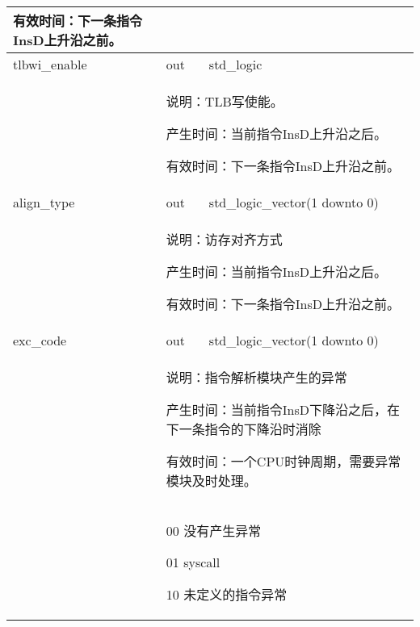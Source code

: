 \begin{tabularx}{\textwidth}{lll}
{                有效时间：下一条指令InsD上升沿之前。
            } \\
            \midrule
            tlbwi\_enable   & out       & std\_logic \\
            \cmidrule(l){2-3}
            &
            \multicolumn{2}{X}{
                说明：TLB写使能。

                产生时间：当前指令InsD上升沿之后。

                有效时间：下一条指令InsD上升沿之前。
            } \\
            \midrule
            align\_type   & out       & std\_logic\_vector(1 downto 0) \\
            \cmidrule(l){2-3}
            &
            \multicolumn{2}{X}{
                说明：访存对齐方式

                产生时间：当前指令InsD上升沿之后。

                有效时间：下一条指令InsD上升沿之前。
            } \\
            \midrule
            exc\_code   & out       & std\_logic\_vector(1 downto 0) \\
            \cmidrule(l){2-3}
            &
            \multicolumn{2}{X}{
                说明：指令解析模块产生的异常

                产生时间：当前指令InsD下降沿之后，在下一条指令的下降沿时消除

                有效时间：一个CPU时钟周期，需要异常模块及时处理。
            } \\
            &
            \multicolumn{2}{X}{
                00 没有产生异常

                01 syscall

                10 未定义的指令异常
            } \\
            \bottomrule
            \end{tabularx}
